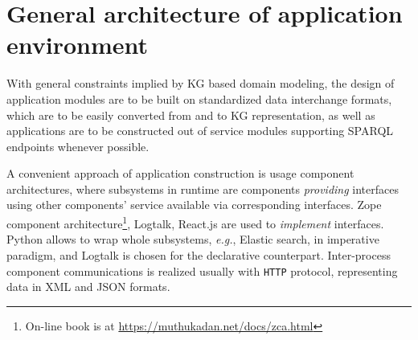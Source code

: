 \documentclass[a4paper]{jctart19a}
\begin{document}

\section{General architecture of application environment}
\label{sec:architecture}

With general constraints implied by KG based domain modeling, the design of application modules are to be built on standardized data interchange formats, which are to be easily converted from and to KG representation, as well as applications are to be constructed out of service modules supporting SPARQL endpoints whenever possible.

A convenient approach of application construction is usage component architectures, where subsystems in runtime are components \emph{providing} interfaces using other components' service available via corresponding interfaces.  Zope component architecture\footnote{On-line book is at \url{https://muthukadan.net/docs/zca.html}}, Logtalk, React.js are used to \emph{implement} interfaces.  Python allows to wrap whole subsystems, \emph{e.g.}, Elastic search, in imperative paradigm, and Logtalk is chosen for the declarative counterpart.  Inter-process component communications is realized usually with \texttt{HTTP} protocol, representing data in XML and JSON formats.
\end{document}
